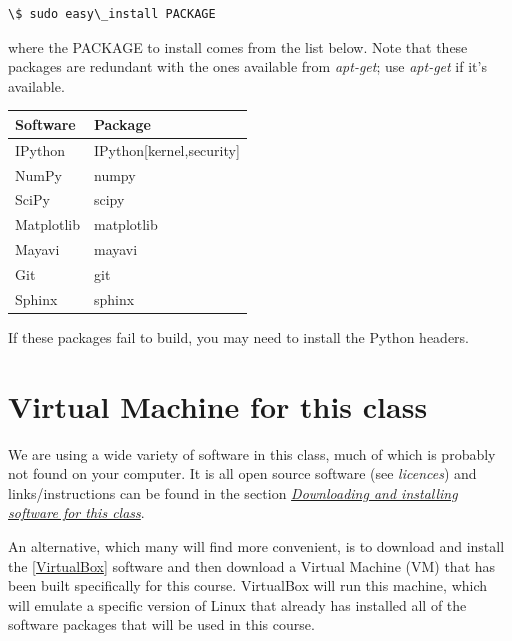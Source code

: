 \documentclass[letterpaper,10pt,english]{sphinxmanual}
\begin{document}
\begin{Verbatim}[commandchars=\\\{\}]
\$ sudo easy\_install PACKAGE
\end{Verbatim}

where the PACKAGE to install comes from the list below.  Note that
these packages are redundant with the ones available from \emph{apt-get};
use \emph{apt-get} if it's available.

\begin{tabulary}{\linewidth}{|L|L|}
\hline
\textbf{
Software
} & \textbf{
Package
}\\\hline

IPython
 & 
IPython{[}kernel,security{]}
\\\hline

NumPy
 & 
numpy
\\\hline

SciPy
 & 
scipy
\\\hline

Matplotlib
 & 
matplotlib
\\\hline

Mayavi
 & 
mayavi
\\\hline

Git
 & 
git
\\\hline

Sphinx
 & 
sphinx
\\\hline
\end{tabulary}


If these packages fail to build, you may need to install the Python
headers.


\section{Virtual Machine for this class}
\label{vm::doc}\label{vm:vm}\label{vm:virtual-machine-for-this-class}
We are using a wide variety of software in this class, much of which is
probably not found on your computer.  It is all open source software (see
\emph{licences}) and links/instructions
can be found in the section {\hyperref[software_installation:software-installation]{\emph{Downloading and installing software for this class}}}.

An alternative, which many will find more convenient, is to download and
install the {\hyperref[biblio:virtualbox]{{[}VirtualBox{]}}} software and then download a Virtual Machine (VM)
that has been built specifically for this course.  VirtualBox will run this
machine, which will emulate a specific version of Linux that already has
installed all of the software packages that will be used in this course.
\end{document}
